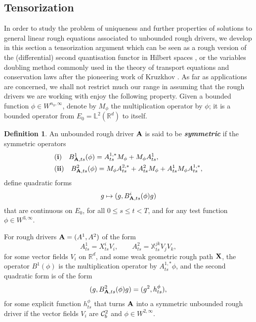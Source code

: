 \documentclass[11pt,a4paper]{amsart}
\newcommand{\RR}{\mathbb{R}}  \newcommand{\CC}{\mathbb{C}}  \newcommand{\LL}{\mathbb{L}}  \newcommand{\WW}{\mathbb{W}}
\newcommand{\bbX}{\mathbb{X}}
\renewcommand{\leq}{\leqslant}
\theoremstyle{plain}%
\theoremstyle{definition}
\newtheorem{definition}[theorem]{Definition}
\theoremstyle{remark}
\numberwithin{equation}{section} %
\begin{document}
\bigskip


\subsection{Tensorization}
\label{SubsectionTensorization}

In order to study the problem of uniqueness and further properties of solutions to general linear rough equations associated to unbounded rough drivers, we develop in this section a tensorization argument which can be seen as a rough version of the (differential) second quantisation functor in Hilbert spaces \cite{ReedSimon}, or the variables doubling method commonly used in the theory of transport equations and conservation laws after the pioneering work of Kruzkhov \cite{Kruzkhov}. As far as applications are concerned, we shall not restrict much our range in assuming that the rough drivers we are working with enjoy the following property. Given a bounded function $\phi\in W^{n_0,\infty}$, denote by $M_\phi$ the multiplication operator by $\phi$; it is a bounded operator from $E_0 = \LL^2(\RR^d)$ to itself.

\begin{definition}
\label{DefnSymmetricDriver}
An unbounded rough driver $\bf A$ is said to be \textbf{\emph{symmetric}} if the symmetric operators 
\begin{equation*}
\begin{split}
&{\bf (i)}\quad B^1_{{\bf A},ts}(\phi) = A^{1,*}_{ts}M_\phi  + M_\phi A^1_{ts} , \\
&{\bf (ii)}\quad B^2_{{\bf A},ts}(\phi) = M_\phi A^{2,*}_{ts}  +  A^2_{ts}M_\phi + A_{ts}^1 M_\phi A^{1,*}_{ts},
\end{split}
\end{equation*}
define quadratic forms 
$$
g\mapsto (g,B^i_{{\bf A},ts}(\phi)g)
$$
that are continuous on $E_0$, for all $0\leq s\leq t<T$, and for any test function $\phi\in W^{3,\infty}$.
\end{definition}

For rough drivers ${\bf A} = (A^1,A^2)$ of the form 
$$
A^1_{ts} = X^i_{ts} V_i, \quad\quad A^2_{ts} = {\bbX}^{jk}_{ts} V_jV_k,
$$
for some vector fields $V_i$ on $\RR^d$, and some weak geometric rough path ${\bf X}$, the operator $B^1(\phi)$ is the multiplication operator by $A^{1,*}_{ts}\phi$, and the second quadratic form is of the form
$$
(g,B^2_{{\bf A},ts}(\phi)g) = (g^2 , h^\phi_{ts}),
$$
for some explicit function $h^\phi_{ts}$ that turns $\bf A$ into a symmetric unbounded rough driver if the vector fields $V_i$ are $\mathcal{C}^2_b$ and $\phi\in W^{2,\infty}$. 
\end{document}
